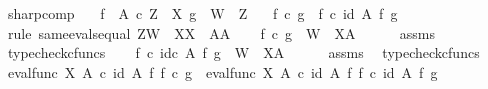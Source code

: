 \begin{isabellebody}
\endisatagproof
{\isafoldproof}%
%
\isadelimproof
\isanewline
%
\endisadelimproof
\isanewline
{}\isamarkupfalse%
\ sharp{\isacharunderscore}{\kern0pt}comp{\isacharcolon}{\kern0pt}\isanewline
\ \ \ {\isachardoublequoteopen}f\ {\isacharcolon}{\kern0pt}\ A\ {\isasymtimes}\isactrlsub c\ Z\ {\isasymrightarrow}\ X{\isachardoublequoteclose}\ {\isachardoublequoteopen}g\ {\isacharcolon}{\kern0pt}\ W\ {\isasymrightarrow}\ Z{\isachardoublequoteclose}\isanewline
\ \ \ {\isachardoublequoteopen}f\isactrlsup {\isasymsharp}\ {\isasymcirc}\isactrlsub c\ g\ {\isacharequal}{\kern0pt}\ {\isacharparenleft}{\kern0pt}f\ {\isasymcirc}\isactrlsub c\ {\isacharparenleft}{\kern0pt}id\ A\ {\isasymtimes}\isactrlsub f\ g{\isacharparenright}{\kern0pt}{\isacharparenright}{\kern0pt}\isactrlsup {\isasymsharp}{\isachardoublequoteclose}\isanewline
%
\isadelimproof
%
\endisadelimproof
%
\isatagproof
{}\isamarkupfalse%
\ {\isacharparenleft}{\kern0pt}rule\ same{\isacharunderscore}{\kern0pt}evals{\isacharunderscore}{\kern0pt}equal{\isacharbrackleft}{\kern0pt}\ Z{\isacharequal}{\kern0pt}W{\isacharcomma}{\kern0pt}\ \ X{\isacharequal}{\kern0pt}X{\isacharcomma}{\kern0pt}\ \ A{\isacharequal}{\kern0pt}A{\isacharbrackright}{\kern0pt}{\isacharparenright}{\kern0pt}\isanewline
\ \ \isamarkupfalse%
\ {\isachardoublequoteopen}f\isactrlsup {\isasymsharp}\ {\isasymcirc}\isactrlsub c\ g\ {\isacharcolon}{\kern0pt}\ W\ {\isasymrightarrow}\ X\isactrlbsup A\isactrlesup {\isachardoublequoteclose}\isanewline
\ \ \ \ \isamarkupfalse%
\ assms\ \isamarkupfalse%
\ typecheck{\isacharunderscore}{\kern0pt}cfuncs\isanewline
\ \ \isamarkupfalse%
\ {\isachardoublequoteopen}{\isacharparenleft}{\kern0pt}f\ {\isasymcirc}\isactrlsub c\ id\isactrlsub c\ A\ {\isasymtimes}\isactrlsub f\ g{\isacharparenright}{\kern0pt}\isactrlsup {\isasymsharp}\ {\isacharcolon}{\kern0pt}\ W\ {\isasymrightarrow}\ X\isactrlbsup A\isactrlesup {\isachardoublequoteclose}\isanewline
\ \ \ \ \isamarkupfalse%
\ assms\ \isamarkupfalse%
\ typecheck{\isacharunderscore}{\kern0pt}cfuncs\isanewline
\isanewline
\ \ \isamarkupfalse%
\ {\isachardoublequoteopen}eval{\isacharunderscore}{\kern0pt}func\ X\ A\ {\isasymcirc}\isactrlsub c\ {\isacharparenleft}{\kern0pt}id\ A\ {\isasymtimes}\isactrlsub f\ {\isacharparenleft}{\kern0pt}f\isactrlsup {\isasymsharp}\ {\isasymcirc}\isactrlsub c\ g{\isacharparenright}{\kern0pt}{\isacharparenright}{\kern0pt}\ {\isacharequal}{\kern0pt}\ eval{\isacharunderscore}{\kern0pt}func\ X\ A\ {\isasymcirc}\isactrlsub c\ {\isacharparenleft}{\kern0pt}id\ A\ {\isasymtimes}\isactrlsub f\ f\isactrlsup {\isasymsharp}{\isacharparenright}{\kern0pt}\ {\isasymcirc}\isactrlsub c\ {\isacharparenleft}{\kern0pt}id\ A\ {\isasymtimes}\isactrlsub f\ g{\isacharparenright}{\kern0pt}{\isachardoublequoteclose}\isanewline

\end{isabellebody}
